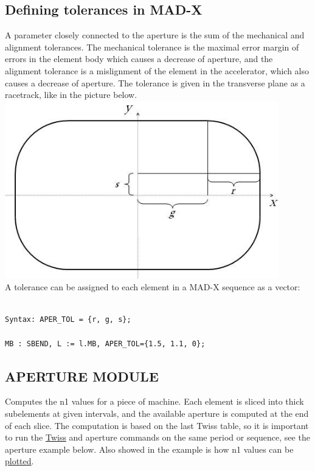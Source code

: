 \subsection{Defining tolerances in MAD-X}
 A parameter closely connected to the aperture is the sum of the mechanical and alignment tolerances. The mechanical tolerance is the maximal error margin of errors in the element body which causes a decrease of aperture, and the alignment tolerance is a mislignment of the element in the accelerator, which also causes a decrease of aperture. The tolerance is given in the transverse plane as a racetrack, like in the picture below.
\\
\includegraphics[width=450px]{Introduction/tolerance.jpg}%
\\ A tolerance can be assigned to each element in a MAD-X sequence as a vector: 
\begin{verbatim}

Syntax: APER_TOL = {r, g, s};

MB : SBEND, L := l.MB, APER_TOL={1.5, 1.1, 0};
\end{verbatim}


\subsection{APERTURE MODULE}
Computes the n1 values for a piece of machine. Each element is sliced into thick subelements at given intervals, and the available aperture is computed at the end of each slice. The computation is based on the last Twiss table, so it is important to run the \href{../twiss/twiss.html}{Twiss} and aperture commands on the same period or sequence, see the aperture example below. Also showed in the example is how n1 values can be \href{../plot/plot.html}{plotted}.  

